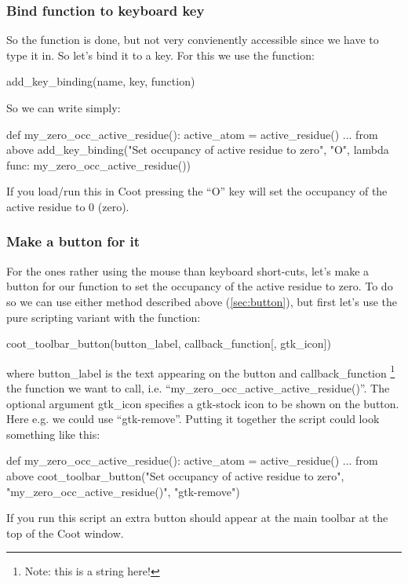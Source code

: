 \documentclass{article}
\begin{document}
\subsubsection{Bind function to keyboard key}
So the function is done, but not very convienently accessible since we have
to type it in. So let's bind it to a key. For this we use the function:
\begin{code}
 add_key_binding(name, key, function)
\end{code}
So we can write simply:
\begin{python}
def my_zero_occ_active_residue():
    active_atom = active_residue()
    ... from above
add_key_binding("Set occupancy of active residue to zero", "O",
                lambda func: my_zero_occ_active_residue())
\end{python}
If you load/run this in Coot pressing the ``O'' key will set the occupancy of
the active residue to 0 (zero).

\subsubsection{Make a button for it}
For the ones rather using the mouse than keyboard short-cuts, let's make a 
button for our function to set the occupancy of the active residue to zero.
To do so we can use either method described above (\ref{sec:button}), but 
first let's use the pure scripting variant with the function:

\begin{code}
 coot_toolbar_button(button_label, callback_function[, gtk_icon]) 
\end{code}

where button\_label is the text appearing on the button and callback\_function
\footnote{Note: this is a string here!} 
the function we want to call, i.e. ``my\_zero\_occ\_active\_active\_residue()''.
The optional argument gtk\_icon specifies a gtk-stock icon to be shown on the
button. Here e.g. we could use ``gtk-remove''. Putting it together the script 
could look something like this:
\begin{python}
def my_zero_occ_active_residue():
    active_atom = active_residue()
    ... from above
coot_toolbar_button("Set occupancy of active residue to zero",
                    "my_zero_occ_active_residue()", "gtk-remove") 
\end{python}
If you run this script an extra button should appear at the main toolbar
at the top of the Coot window.
\end{document}
